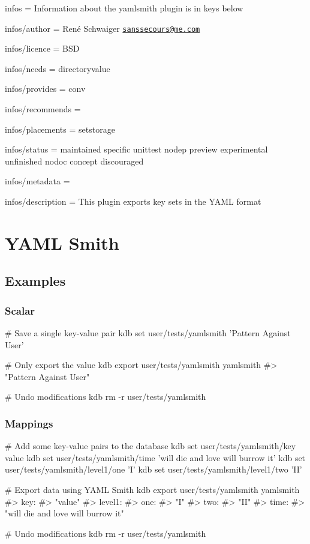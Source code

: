 
\begin{DoxyItemize}
\item infos = Information about the yamlsmith plugin is in keys below
\item infos/author = René Schwaiger \href{mailto:sanssecours@me.com}{\tt sanssecours@me.\+com}
\item infos/licence = B\+SD
\item infos/needs = directoryvalue
\item infos/provides = conv
\item infos/recommends =
\item infos/placements = setstorage
\item infos/status = maintained specific unittest nodep preview experimental unfinished nodoc concept discouraged
\item infos/metadata =
\item infos/description = This plugin exports key sets in the Y\+A\+ML format
\end{DoxyItemize}\hypertarget{md_src_plugins_yamlsmith_README_src_plugins_yamlsmith_README_md}{}\section{Y\+A\+M\+L Smith}\label{md_src_plugins_yamlsmith_README_src_plugins_yamlsmith_README_md}
\subsection*{Examples}

\subsubsection*{Scalar}


\begin{DoxyCode}
# Save a single key-value pair
kdb set user/tests/yamlsmith 'Pattern Against User'

# Only export the value
kdb export user/tests/yamlsmith yamlsmith
#> "Pattern Against User"

# Undo modifications
kdb rm -r user/tests/yamlsmith
\end{DoxyCode}


\subsubsection*{Mappings}


\begin{DoxyCode}
# Add some key-value pairs to the database
kdb set user/tests/yamlsmith/key value
kdb set user/tests/yamlsmith/time 'will die and love will burrow it'
kdb set user/tests/yamlsmith/level1/one 'I'
kdb set user/tests/yamlsmith/level1/two 'II'

# Export data using YAML Smith
kdb export user/tests/yamlsmith yamlsmith
#> key:
#>   "value"
#> level1:
#>   one:
#>     "I"
#>   two:
#>     "II"
#> time:
#>   "will die and love will burrow it"

# Undo modifications
kdb rm -r user/tests/yamlsmith
\end{DoxyCode}


